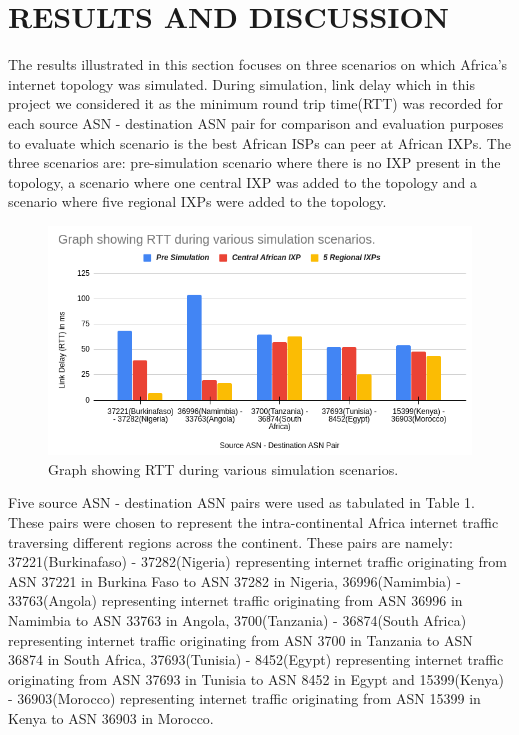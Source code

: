 \section{RESULTS AND DISCUSSION}\label{sec:results-and-discussion}
The results illustrated in this section focuses on three scenarios on which Africa's internet topology was simulated. During simulation, link delay which in this project we considered it as the minimum round trip time(RTT) was recorded for each source ASN - destination ASN pair for comparison and evaluation purposes to evaluate which scenario is the best African ISPs can peer at African IXPs. The three scenarios are: pre-simulation scenario where there is no IXP present in the topology, a scenario where one central IXP was added to the topology and a scenario where five regional IXPs were added to the topology. 
 \begin{figure}
  
    \begin{center}
        \includegraphics[width=1\linewidth]{sections/pictures-diagrams/graph22.png}
    \end{center}
    \caption{Graph showing RTT during various simulation scenarios.}
    \label{figure:state}
\end{figure}
Five source ASN - destination ASN pairs were used as tabulated in Table 1. These pairs were chosen to represent the intra-continental Africa internet traffic traversing different regions across the continent. These pairs are namely: 37221(Burkinafaso) - 37282(Nigeria) representing internet traffic originating from ASN 37221 in Burkina Faso to ASN 37282 in Nigeria, 36996(Namimbia) - 33763(Angola) representing internet traffic originating from ASN 36996 in Namimbia to ASN 33763 in Angola, 3700(Tanzania) - 36874(South Africa) representing internet traffic originating from ASN 3700 in Tanzania to ASN 36874 in South Africa, 37693(Tunisia) - 8452(Egypt) representing internet traffic originating from ASN 37693 in Tunisia to ASN 8452 in Egypt and 15399(Kenya) - 36903(Morocco) representing internet traffic originating from ASN 15399 in Kenya to ASN 36903 in Morocco.

